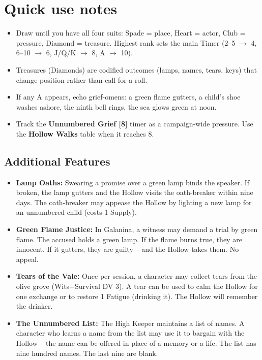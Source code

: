\section*{Quick use notes}
\label{sec:galanina-quick-use}
\begin{itemize}
\item Draw until you have all four suits: Spade = place, Heart = actor, Club = pressure, Diamond = treasure. Highest rank sets the main Timer (2--5 $\rightarrow$ 4, 6--10 $\rightarrow$ 6, J/Q/K $\rightarrow$ 8, A $\rightarrow$ 10).
\item Treasures (Diamonds) are codified outcomes (lamps, names, tears, keys) that change position rather than call for a roll.
\item If any A appears, echo grief-omens: a green flame gutters, a child's shoe washes ashore, the ninth bell rings, the sea glows green at noon.
\item Track the \textbf{Unnumbered Grief [8]} timer as a campaign-wide pressure. Use the \textbf{Hollow Walks} table when it reaches 8.
\end{itemize}

\subsection*{Additional Features}
\begin{itemize}
\item \textbf{Lamp Oaths:} Swearing a promise over a green lamp binds the speaker. If broken, the lamp gutters and the Hollow visits the oath-breaker within nine days. The oath-breaker may appease the Hollow by lighting a new lamp for an unnumbered child (costs 1 Supply).
\item \textbf{Green Flame Justice:} In Galanina, a witness may demand a trial by green flame. The accused holds a green lamp. If the flame burns true, they are innocent. If it gutters, they are guilty -- and the Hollow takes them. No appeal.
\item \textbf{Tears of the Vale:} Once per session, a character may collect tears from the olive grove (Wits+Survival DV 3). A tear can be used to calm the Hollow for one exchange or to restore 1 Fatigue (drinking it). The Hollow will remember the drinker.
\item \textbf{The Unnumbered List:} The High Keeper maintains a list of names. A character who learns a name from the list may use it to bargain with the Hollow -- the name can be offered in place of a memory or a life. The list has nine hundred names. The last nine are blank.
\end{itemize}

